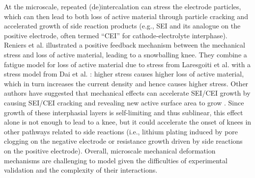 \documentclass[journal=jpclcd,manuscript=article]{achemso}
\begin{document}
At the microscale, repeated (de)intercalation can stress the electrode particles, which can then lead to both loss of active material through particle cracking and accelerated growth of side reaction products (e.g., SEI and its analogue on the positive electrode, often termed ``CEI'' for cathode-electrolyte interphase).
Reniers et al. \cite{reniers_review_2019} illustrated a positive feedback mechanism between the mechanical stress and loss of active material, leading to a snowballing knee. They combine a fatigue model for loss of active material due to stress from Laresgoiti et al. \cite{laresgoiti_modeling_2015} with a stress model from Dai et al. \cite{dai_simulation_2014}{}: higher stress causes higher loss of active material, which in turn increases the current density and hence causes higher stress.
Other authors have suggested that mechanical effects can accelerate SEI/CEI growth by causing SEI/CEI cracking and revealing new active surface area to grow \cite{pinson_theory_2013,kupper_end--life_2018,louli_operando_2019, jana_physical_2019}. Since growth of these interphasial layers is self-limiting and thus sublinear\cite{bloom_accelerated_2001, broussely_aging_2001, wright_calendar-_2002, smith_high_2011, attia_revisiting_2020}, this effect alone is not enough to lead to a knee, but it could accelerate the onset of knees in other pathways related to side reactions (i.e., lithium plating induced by pore clogging on the negative electrode \cite{lewerenz_post-mortem_2017} or resistance growth driven by side reactions on the positive electrode\cite{ma_editors_2019, jana_physical_2019}).
Overall, microscale mechanical deformation mechanisms are challenging to model given the difficulties of experimental validation and the complexity of their interactions.
\end{document}
